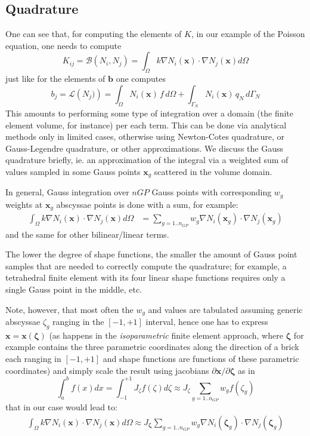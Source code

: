 \documentclass{digitaldynamics}
\def\vect#1{\bm{#1}}
\def\matr#1{{#1}}
\begin{document}
\subsection{Quadrature}

One can see that, for computing the elements of $\matr{K}$, in our example of the Poisson equation, one needs to compute 
\[
K_{ij}  = \mathcal{B}\left(N_i,N_j \right) = \int_\Omega k \nabla N_i(\vect{x}) \cdot \nabla N_j(\vect{x}) d\Omega
\]
just like for the elements of $\vect{b}$ one computes
\[
b_j  = \mathcal{L}\left( N_j )\right) = \int_\Omega N_i(\vect{x}) \, f \,d\Omega + \int_{\Gamma_N} N_i(\vect{x}) \, q_N \,d\Gamma_N
\]
This amounts to performing some type of integration over a domain (the finite element volume, for instance) per each term. This can be
done via analytical methods only in limited cases, otherwise using Newton-Cotes quadrature, or Gauss-Legendre quadrature, or other approximations. 
We discuss the Gauss quadrature briefly, ie. an approximation of the integral via a weighted sum of values sampled in some Gauss points $\vect{x}_g$ scattered in the volume domain.

In general, Gauss integration over $n{GP}$ Gauss points with corresponding $w_g$ weights at $\vect{x}_g$ abscyssae points is done with a sum, for example:
\begin{align*}
\int_\Omega k \nabla N_i(\vect{x}) \cdot \nabla N_j(\vect{x}) d\Omega &= \sum_{g=1..n_{GP}} w_g \nabla N_i(\vect{x}_g) \cdot \nabla N_j(\vect{x}_g)
\end{align*}
and the same for other bilinear/linear terms.
 
The lower the degree of shape functions, the smaller the amount of Gauss point samples that are needed to correctly compute the quadrature; for example, a tetrahedral finite element with its four linear shape functions requires only a single Gauss point in the middle, etc. 

Note, however, that most often the $w_g$ and values are tabulated assuming generic abscyssae $\zeta_g$ ranging in the $[-1,+1]$ interval, hence one has to express $\vect{x}=\vect{x}(\vect{\zeta})$ (as happens in the \textit{isoparametric} finite element approach, where $\vect{\zeta}$ for example contains the three parametric coordinates along the direction of a brick each ranging in $[-1,+1]$ and shape functions are functions of these parametric coordinates) and simply scale the result using jacobians $\partial\vect{x}/\partial\vect{\zeta}$ as in
\[
\int_a^b f(x) dx = \int_{-1}^{+1} J_{\zeta} f(\zeta) d\zeta \approx J_{\zeta} \sum_{g=1..n_{GP}} w_g f(\zeta_g)
\]
that in our case would lead to:
\begin{align*}
\int_\Omega k \nabla N_i(\vect{x}) \cdot \nabla N_j(\vect{x}) d\Omega \approx J_{\vect{\zeta}} \sum_{g=1..n_{GP}} w_g \nabla N_i(\vect{\zeta}_g) \cdot \nabla N_j(\vect{\zeta}_g)
\end{align*} 
\end{document}

